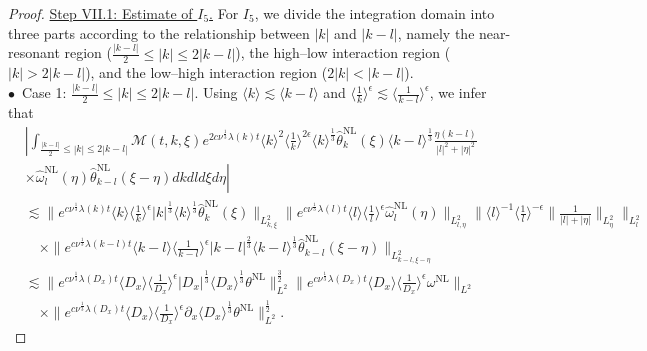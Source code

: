 \documentclass[reqno, 12pt]{amsart} %
\theoremstyle{plain} %
\theoremstyle{definition}
\theoremstyle{remark}
\numberwithin{equation}{section} %
\newcommand{\no}{\nonumber}
\newcommand{\lt}{\left}
\newcommand{\rt}{\right}
\newcommand{\px}{\partial_x}
\begin{document}
\begin{proof}
		\underline{ Step VII.1: Estimate of $ I_5$.}   
		For $I_5$, we divide the integration domain into three parts according to the relationship between $|k|$ and $|k - l|$, namely the near-resonant region ($\frac{|k-l|}{2} \leq |k| \leq 2|k-l|$), the high–low interaction region ($|k| > 2|k-l| $), and the low–high interaction region ($2|k| < |k-l| $). \\
		$\bullet$~Case 1:   $\frac{|k-l|}{2} \leq |k| \leq 2|k-l|$. Using $\langle k \rangle \lesssim \langle k-l \rangle$ and $\langle \frac1k \rangle^\epsilon \lesssim \langle \frac1{k-l}\rangle^\epsilon$,  we infer that
		\begin{align} \label{eq:temp33}
			& \left| \int_{\frac{|k-l|}{2} \leq |k| \leq 2|k-l|} \mathcal{M}(t, k, \xi) e^{2 c \nu^{\frac{1}{3}} \lambda(k) t}\langle k\rangle^2\langle\frac{1}{k}\rangle^{2 \epsilon} \langle k \rangle^\frac13\hat{\theta}_k^{\mathrm{NL}}(\xi) \langle k-l \rangle^\frac13  \frac{\eta(k-l)}{|l|^2+|\eta|^2}\right. \no\\
			&\lt. \times \hat{\omega}_l^{\mathrm{NL}}(\eta) \hat{\theta}_{k-l}^{\mathrm{NL}}(\xi-\eta) d k d l d \xi d \eta \rt| \no\\
			& \no\lesssim\|e^{c \nu^{\frac{1}{3}} \lambda(k) t}  \langle k \rangle \langle \frac1k \rangle^\epsilon |k|^\frac13\langle k \rangle^\frac13 \hat{\theta}_k^{\mathrm{NL}}(\xi)\|_{L_{k, \xi}^2}\|e^{c \nu^{\frac{1}{3}} \lambda(l) t}\langle l\rangle\langle\frac{1}{l}\rangle^\epsilon \hat{\omega}_l^{\mathrm{NL}}(\eta)\|_{L_{l, \eta}^2}\|\langle l\rangle^{-1}\langle\frac{1}{l}\rangle^{-\epsilon}\| \frac{1}{|l|+|\eta|}\|_{L_\eta^2}\|_{L_l^2} \\
			&\no \quad \times\|e^{c \nu^{\frac{1}{3}} \lambda(k-l) t}\langle k-l \rangle \langle \frac{1}{k-l} \rangle^\epsilon |k-l|^\frac23 \langle k-l \rangle^\frac13 \hat{\theta}_{k-l}^{\mathrm{NL}}(\xi-\eta)\|_{L_{k-l, \xi-\eta}^2} \\
			&\no \lesssim\|e^{c \nu^{\frac{1}{3}} \lambda\left(D_x\right) t}\langle D_x\rangle    \langle \frac{1}{D_x}\rangle^\epsilon  \left|D_x\right|^{\frac{1}{3}}\langle D_x \rangle^\frac13 \theta^{\mathrm{NL}}\|_{L^2}^\frac32 \|e^{c \nu^{\frac{1}{3}} \lambda\left(D_x\right) t}\langle D_x\rangle\langle\frac{1}{D_x}\rangle^\epsilon \omega^{\mathrm{NL}}\|_{L^2} \\
			& \quad \times\|e^{c \nu^{\frac{1}{3}} \lambda\left(D_x\right) t}\langle D_x\rangle\langle\frac{1}{D_x}\rangle^\epsilon \px \langle D_x \rangle^{\frac{1}{3}} \theta^{\mathrm{NL}}\|_{L^2}^\frac12.
		\end{align}

\end{proof}
\end{document}
